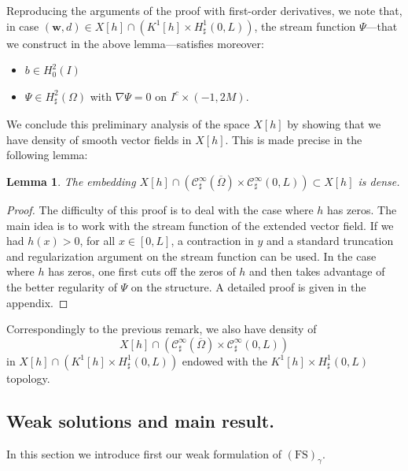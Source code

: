 \documentclass[11pt]{article}
\let\mathcal\mathscr
\newcommand{\FS}{\mathrm{FS}}
\newtheorem{lemma}[theorem]{Lemma}
\theoremstyle{remark}
\theoremstyle{definition}
\newcommand{\wg}{\boldsymbol{w}}
\let\CM\Omega
\begin{document}
Reproducing the arguments of the proof with first-order derivatives, we note that, in case $(\wg,d) \in X[h] \cap (K^1[h] \times H^1_{\sharp}(0,L))$, the stream function $\Psi$---that we construct in the above lemma---satisfies moreover:\enlargethispage{.5\baselineskip}%
\begin{itemize}
\item $ b \in H^2_0(I)$
\item $ \Psi \in H^2_{\sharp}(\Omega)$ with $\nabla \Psi = 0$ on $I^c \times (-1,2M)$.
\end{itemize}
We conclude this preliminary analysis of the space $X[h]$
by showing that we have density of smooth vector fields in
$X[h]$. This is made precise in the following lemma:

\begin{lemma}\label{lemma.density}The embedding $X[h]\cap (\mathcal{C}_\sharp^{\infty}(\overline{\CM})\times\mathcal{C}_\sharp^{\infty}(0, L))\subset X[h]$ is dense.
\end{lemma}
\begin{proof}
The difficulty of this proof is to deal with the case where $h$ has zeros. The main idea is to work with the stream function
of the extended vector field. If we had $h(x)>0$, for all $x\in [0, L]$, a contraction in $y$ and a standard truncation and regularization argument on the stream function can be used. In the case where $h$ has zeros, one first cuts off the zeros of $h$ and then takes advantage of the better regularity of $\Psi$ on the structure. A detailed proof is given in the appendix.
\end{proof}

Correspondingly to the previous remark, we also have density of\vspace*{-3pt}
\[
X[h] \cap (\mathcal{C}_\sharp^{\infty}(\overline{\CM})\times\mathcal{C}_\sharp^{\infty}(0, L))
\]
in $X[h] \cap (K^1[h] \times H^1_{\sharp}(0,L))$ endowed with the $K^1[h] \times H^1_{\sharp}(0,L)$
topology.

\subsection{Weak solutions and main result.}

In this section we introduce first our weak formulation of $(\FS)_{\gamma}$.
\end{document}
